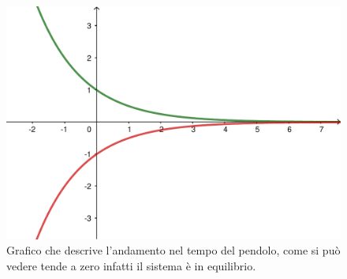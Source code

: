 \begin{nexample}
			\begin{figure}[H]
				\centering
				\includegraphics[scale=0.5]{immagini/cap3_Sistemi/sistEquilib.pdf}
				\caption{ Grafico che descrive l'andamento nel tempo del pendolo, come si può vedere tende a zero infatti il sistema è in equilibrio. }
				\label{fig: funzpendolo}
			\end{figure}
			
		\end{nexample}


